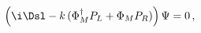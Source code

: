 \begin{equation}
\left(\i \Dsl - k\,  (\Phi_M^\dagger P_L + \Phi_M P_R)\right) \Psi =0\,,
\label{Diraceq}
\end{equation}

